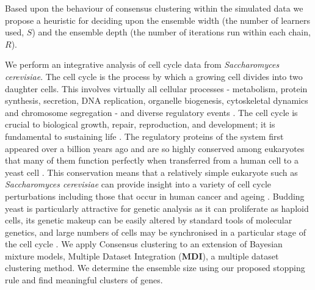 \documentclass{bioinfo}
\begin{document}
Based upon the behaviour of consensus clustering within the simulated data we propose a heuristic for deciding upon the ensemble width (the number of learners used, $S$) and the ensemble depth (the number of iterations run within each chain, $R$).


We perform an integrative analysis of cell cycle data from \emph{Saccharomyces cerevisiae}. The cell cycle is the process by which a growing cell divides into two daughter cells. This involves virtually all cellular processes - metabolism, protein synthesis, secretion, DNA replication, organelle biogenesis, cytoskeletal dynamics and chromosome segregation - and diverse regulatory events \citep{granovskaia2010high}. The cell cycle is crucial to biological growth, repair, reproduction, and development; it is fundamental to sustaining life \citep{tyson2013cell, chen2004integrative, alberts2018molecular}. The regulatory proteins of the system first appeared over a billion years ago and are so highly conserved among eukaryotes that many of them function perfectly when transferred from a human cell to a yeast cell \citep{alberts2018molecular}. This conservation means that a relatively simple eukaryote such as \emph{Saccharomyces cerevisiae} can provide insight into a variety of cell cycle perturbations including those that occur in human cancer \citep{ingalls2007systems, chen2004integrative} and ageing \citep{jimenez2015live}. Budding yeast is particularly attractive for genetic analysis as it can proliferate as haploid cells, its genetic makeup can be easily altered by standard tools of molecular genetics, and large numbers of cells may be synchronised in a particular stage of the cell cycle  \citep{tyson2013cell, juanes2017methods}. We apply Consensus clustering to an extension of Bayesian mixture models, Multiple Dataset Integration (\textbf{MDI}), a multiple dataset clustering method. 
We determine the ensemble size using our proposed stopping rule and find meaningful clusters of genes. 
\end{document}
